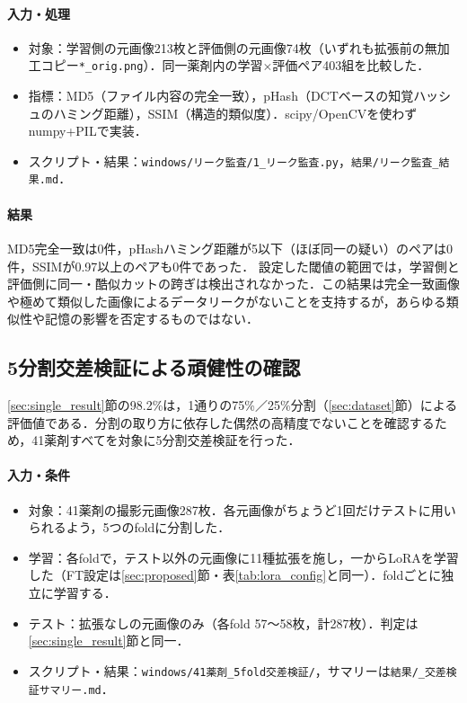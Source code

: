 \documentclass[dvipdfmx]{jsarticle}
\begin{document}
\paragraph{入力・処理}
\begin{itemize}
  \item 対象：学習側の元画像213枚と評価側の元画像74枚（いずれも拡張前の無加工コピー\texttt{*\_orig.png}）．同一薬剤内の学習$\times$評価ペア403組を比較した．
  \item 指標：MD5（ファイル内容の完全一致），pHash（DCTベースの知覚ハッシュのハミング距離），SSIM（構造的類似度）．scipy/OpenCVを使わずnumpy+PILで実装．
  \item スクリプト・結果：\texttt{windows/リーク監査/1\_リーク監査.py}，\texttt{結果/リーク監査\_結果.md}．
\end{itemize}

\paragraph{結果}
MD5完全一致は0件，pHashハミング距離が5以下（ほぼ同一の疑い）のペアは0件，SSIMが0.97以上のペアも0件であった．
設定した閾値の範囲では，学習側と評価側に同一・酷似カットの跨ぎは検出されなかった．この結果は完全一致画像や極めて類似した画像によるデータリークがないことを支持するが，あらゆる類似性や記憶の影響を否定するものではない．

\subsection{5分割交差検証による頑健性の確認}\label{sec:cv}

\ref{sec:single_result}節の98.2\%は，1通りの75\%／25\%分割（\ref{sec:dataset}節）による評価値である．分割の取り方に依存した偶然の高精度でないことを確認するため，41薬剤すべてを対象に5分割交差検証を行った．

\paragraph{入力・条件}
\begin{itemize}
  \item 対象：41薬剤の撮影元画像287枚．各元画像がちょうど1回だけテストに用いられるよう，5つのfoldに分割した．
  \item 学習：各foldで，テスト以外の元画像に11種拡張を施し，一からLoRAを学習した（FT設定は\ref{sec:proposed}節・表\ref{tab:lora_config}と同一）．foldごとに独立に学習する．
  \item テスト：拡張なしの元画像のみ（各fold 57〜58枚，計287枚）．判定は\ref{sec:single_result}節と同一．
  \item スクリプト・結果：\texttt{windows/41薬剤\_5fold交差検証/}，サマリーは\texttt{結果/\_交差検証サマリー.md}．
\end{itemize}
\end{document}
